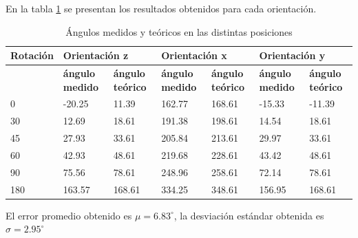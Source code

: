 \documentclass[spanish,12pt,a4paper,titlepage]{report}
\begin{document}
En la tabla \ref{tab:angulos} se presentan los resultados obtenidos para cada orientación. 



\begin{table}
\begin{tabular}{|p{50pt}|p{50pt}|p{50pt}|p{50pt}|p{51pt}|p{50pt}|p{50pt}|}
\hline
 {\cellcolor[gray]{0.6} \textbf{Rotación}}  
& \multicolumn{2}{|p{113pt}|}{\cellcolor[gray]{0.6} \textbf{Orientación z}}  
& \multicolumn{2}{|p{114pt}|}{\cellcolor[gray]{0.6} \textbf{Orientación x}}
& \multicolumn{2}{|p{113pt}|}{\cellcolor[gray]{0.6} \textbf{Orientación y}} 
\\ \hline 
   
& \multicolumn{1}{|p{50pt}|}{\cellcolor[gray]{0.7} \textbf{ángulo medido}} 
& \multicolumn{1}{|p{50pt}|}{\cellcolor[gray]{0.8} \textbf{ángulo teórico}}
& \multicolumn{1}{|p{50pt}|}{\cellcolor[gray]{0.7} \textbf{ángulo medido}} 
& \multicolumn{1}{|p{51pt}|}{\cellcolor[gray]{0.8} \textbf{ángulo teórico}}
& \multicolumn{1}{|p{50pt}|}{\cellcolor[gray]{0.7} \textbf{ángulo medido}} 
& \multicolumn{1}{|p{50pt}|}{\cellcolor[gray]{0.8} \textbf{ángulo teórico}}
\\ \hline

 0    &    -20.25  & 11.39& 162.77& 168.61&-15.33 & -11.39\\ \hline
 30   &   12.69    & 18.61& 191.38& 198.61&14.54 & 18.61 \\ \hline
 45   &   27.93 	  &	33.61 & 205.84 & 213.61 & 29.97 & 33.61 \\ \hline
 60   &   42.93 	  & 48.61 & 219.68 & 228.61 & 43.42 & 48.61 \\ \hline
 90   &   75.56 	  & 78.61 & 248.96 & 258.61 & 72.14 & 78.61 \\ \hline
 180  &   163.57	  &	168.61& 334.25 & 348.61 & 156.95 & 168.61 \\ \hline
 
\end{tabular}
\caption{Ángulos medidos y teóricos en las distintas posiciones}
\label{tab:angulos}
\end{table} 


El error promedio obtenido es $\mu=6.83^\circ$, la desviación estándar obtenida es $\sigma
=2.95^\circ$
\end{document}

